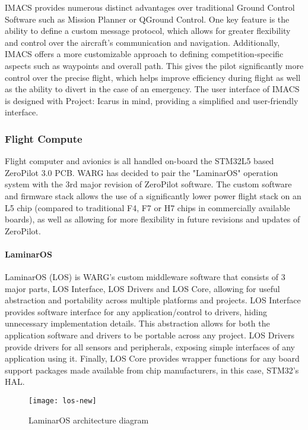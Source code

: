 IMACS provides numerous distinct advantages over traditional Ground Control
Software such as Mission Planner or QGround Control. One key feature is the
ability to define a custom message protocol, which allows for greater
flexibility and control over the aircraft's communication and navigation.
Additionally, IMACS offers a more customizable approach to defining
competition-specific aspects such as waypoints and overall path. This gives the
pilot significantly more control over the precise flight, which helps improve
efficiency during flight as well as the ability to divert in the case of an
emergency. The user interface of IMACS is designed with Project: Icarus in
mind, providing a simplified and user-friendly interface.

\subsubsection{Flight Compute}
\label{sec:flight-compute}

Flight computer and avionics is all handled on-board the STM32L5 based
ZeroPilot 3.0 PCB. WARG has decided to pair the "LaminarOS" operation system
with the 3rd major revision of ZeroPilot software. The custom software and
firmware stack allows the use of a significantly lower power flight stack on an
L5 chip (compared to traditional F4, F7 or H7 chips in commercially available
boards), as well as allowing for more flexibility in future revisions and
updates of ZeroPilot.

\paragraph{LaminarOS}

LaminarOS (LOS) is WARG's custom middleware software that consists of 3 major
parts, LOS Interface, LOS Drivers and LOS Core, allowing for useful abstraction
and portability across multiple platforms and projects. LOS Interface provides
software interface for any application/control to drivers, hiding unnecessary
implementation details. This abstraction allows for both the application
software and drivers to be portable across any project. LOS Drivers provide
drivers for all sensors and peripherals, exposing simple interfaces of any
application using it. Finally, LOS Core provides wrapper functions for any
board support packages made available from chip manufacturers, in this case,
STM32's HAL.

\begin{figure}[H]
        \centering
        \texttt{[image: los-new]}
        \caption{LaminarOS architecture diagram}
\end{figure}

